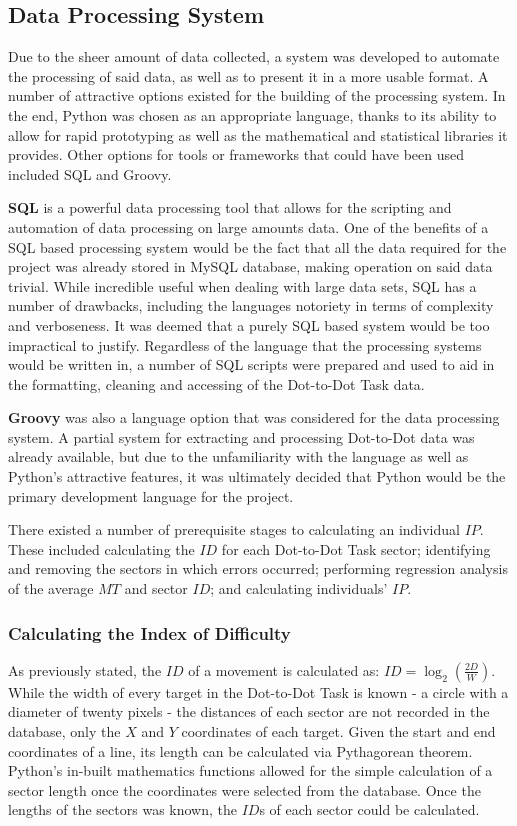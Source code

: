 	\subsection{Data Processing System}
		Due to the sheer amount of data collected, a system was developed to automate the processing of said data, as well as to present it in a more usable format. A number of attractive options existed for the building of the processing system. In the end, Python was chosen as an appropriate language, thanks to its ability to allow for rapid prototyping as well as the mathematical and statistical libraries it provides.  Other options for tools or frameworks that could have been used included SQL and Groovy. 
		
		\textbf{SQL} is a powerful data processing tool that allows for the scripting and automation of data processing on large amounts data. One of the benefits of a SQL based processing system would be the fact that all the data required for the project was already stored in MySQL database, making operation on said data trivial. While incredible useful when dealing with large data sets, SQL has a number of drawbacks, including the languages notoriety in terms of complexity and verboseness. It was deemed that a purely SQL based system would be too impractical to justify. Regardless of the language that the processing systems would be written in, a number of SQL scripts were prepared and used to aid in the formatting, cleaning and accessing of the Dot-to-Dot Task data.
		
		\textbf{Groovy} was also a language option that was considered for the data processing system. A partial system for extracting and processing Dot-to-Dot data was already available, but due to the unfamiliarity with the language as well as Python's attractive features, it was ultimately decided that Python would be the primary development language for the project.
		
		There existed a number of prerequisite stages to calculating an individual \(IP\). These included calculating the \(ID\) for each Dot-to-Dot Task sector; identifying and removing the sectors in which errors occurred; performing regression analysis of the average \(MT\) and sector \(ID\); and calculating individuals’ \(IP\).
		
		\subsubsection{Calculating the Index of Difficulty}
			As previously stated, the \(ID\) of a movement is calculated as: \(ID = \log_2\left( \frac{2D}{W}\right)\). While the width of every target in the Dot-to-Dot Task is known -  a circle with a diameter of twenty pixels - the distances of each sector are not recorded in the database, only the \(X\) and \(Y\) coordinates of each target. Given the start and end coordinates of a line, its length can be calculated via Pythagorean theorem. Python’s in-built mathematics functions allowed for the simple calculation of a sector length once the coordinates were selected from the database. Once the lengths of the sectors was known, the \(ID\)s of each sector could be calculated. 
			
